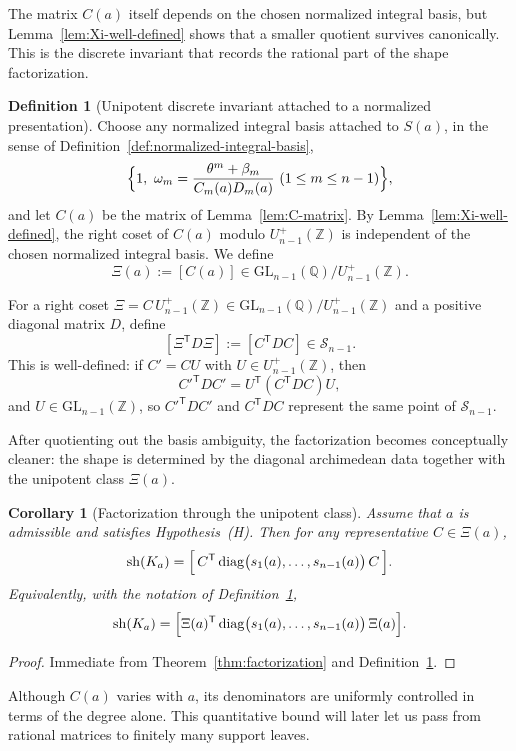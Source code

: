 \documentclass[11pt,letterpaper]{amsart}
\newcommand{\Q}{\mathbb{Q}}
\newcommand{\Z}{\mathbb{Z}}
\newcommand{\GL}{\mathrm{GL}}
\newcommand{\diag}{\mathrm{diag}}
\theoremstyle{plain}
\newtheorem{corollary}[theorem]{Corollary}
\theoremstyle{definition}
\newtheorem{definition}[theorem]{Definition}
\begin{document}
The matrix \(C(a)\) itself depends on the chosen normalized integral basis, but Lemma~\ref{lem:Xi-well-defined} shows that a smaller quotient survives canonically. This is the discrete invariant that records the rational part of the shape factorization.

\begin{definition}[Unipotent discrete invariant attached to a normalized presentation]
\label{def:Xi}
Choose any normalized integral basis attached to \(S(a)\), in the sense of
Definition~\ref{def:normalized-integral-basis},
\[
\Bigl\{1,\ \omega_m=\frac{\theta^m+\beta_m}{C_m(a)D_m(a)}
\ (1\le m\le n-1)\Bigr\},
\]
and let \(C(a)\) be the matrix of Lemma~\ref{lem:C-matrix}.
By Lemma~\ref{lem:Xi-well-defined}, the right coset of \(C(a)\) modulo
\(U_{n-1}^+(\Z)\) is independent of the chosen normalized integral basis.
We define
\[
\Xi(a):=[C(a)]\in \GL_{n-1}(\Q)\big/U_{n-1}^+(\Z).
\]

For a right coset \(\Xi=C\,U_{n-1}^+(\Z)\in \GL_{n-1}(\Q)/U_{n-1}^+(\Z)\) and a positive
diagonal matrix \(D\), define
\[
[\Xi^{\mathsf T}D\Xi]:=[C^{\mathsf T}DC]\in \mathscr S_{n-1}.
\]
This is well-defined: if \(C'=CU\) with \(U\in U_{n-1}^+(\Z)\), then
\[
C'^{\mathsf T}DC' = U^{\mathsf T}(C^{\mathsf T}DC)U,
\]
and \(U\in \GL_{n-1}(\Z)\), so \(C'^{\mathsf T}DC'\) and \(C^{\mathsf T}DC\) represent the
same point of \(\mathscr S_{n-1}\).
\end{definition}

After quotienting out the basis ambiguity, the factorization becomes conceptually cleaner: the shape is determined by the diagonal archimedean data together with the unipotent class \(\Xi(a)\).


\begin{corollary}[Factorization through the unipotent class]
\label{cor:Xi-factorization}
Assume that \(a\) is admissible and satisfies Hypothesis~\textup{(H)}.
Then for any representative \(C\in \Xi(a)\),
\[
\operatorname{sh}(K_a)
=
\Bigl[\,C^{\mathsf T}\,\diag\bigl(s_1(a),\dots,s_{n-1}(a)\bigr)\,C\,\Bigr].
\]
Equivalently, with the notation of Definition~\ref{def:Xi},
\[
\operatorname{sh}(K_a)
=
\Bigl[\Xi(a)^{\mathsf T}\,\diag\bigl(s_1(a),\dots,s_{n-1}(a)\bigr)\,\Xi(a)\Bigr].
\]
\end{corollary}

\begin{proof}
Immediate from Theorem~\ref{thm:factorization} and
Definition~\ref{def:Xi}.
\end{proof}

Although \(C(a)\) varies with \(a\), its denominators are uniformly controlled in terms of the degree alone. This quantitative bound will later let us pass from rational matrices to finitely many support leaves.
\end{document}
